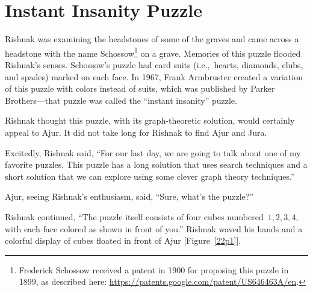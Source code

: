 \chapter{Instant Insanity Puzzle}

Rishnak was examining the headstones of some of the graves and came across a headstone with the name Schossow\footnote{Frederick Schossow received a patent in 1900 for proposing this puzzle in 1899, as described here: \url{https://patents.google.com/patent/US646463A/en}.} on a grave. Memories of this puzzle flooded Rishnak's senses. Schossow's puzzle had card suits (i.e.,~hearts, diamonds, clubs, and spades) marked on each face. In 1967, Frank Armbruster created a variation of this puzzle with colors instead of suits, which was published by Parker Brothers---that puzzle was called the ``instant insanity'' puzzle.

Rishnak thought this puzzle, with its graph-theoretic solution, would certainly appeal to Ajur. It did not take long for Rishnak to find Ajur and Jura.

Excitedly, Rishnak said, ``For our last day, we are going to talk about one of my favorite puzzles. This puzzle has a long solution that uses search techniques and a short solution that we can explore using some clever graph theory techniques.''

Ajur, seeing Rishnak's enthusiasm, said, ``Sure, what's the puzzle?''

Rishnak continued, ``The puzzle itself consists of four cubes numbered~$1,2,3,4$, with each face colored as shown in front of you.'' Rishnak waved his hands and a colorful display of cubes floated in front of Ajur [Figure~\ref{22p1}]. 

